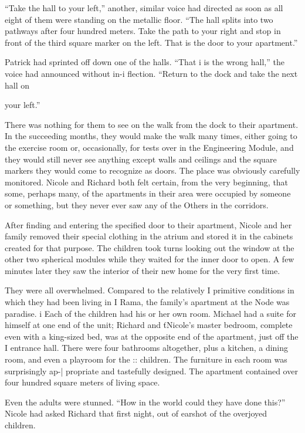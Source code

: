 \documentclass[]{article}
\begin{document}
{“Take the hall to your left,” another, similar voice had directed as soon as all eight of them were standing on the metallic floor. “The hall splits into two pathways after four hundred meters. Take the path to your right and stop in front of the third square marker on the left. That is the door to your apartment.”

Patrick had sprinted off down one of the halls. “That i is the wrong hall,” the voice had announced without in-i flection. “Return to the dock and take the next hall on

your left.”

There was nothing for them to see on the walk from the dock to their apartment. In the succeeding months, they would make the walk many times, either going to the exercise room or, occasionally, for tests over in the Engineering Module, and they would still never see anything except walls and ceilings and the square markers they would come to recognize as doors. The place was obviously carefully monitored. Nicole and Richard both felt certain, from the very beginning, that some, perhaps many, of the apartments in their area were occupied by someone or something, but they never ever saw any of the Others in the corridors.

After finding and entering the specified door to their apartment, Nicole and her family removed their special clothing in the atrium and stored it in the cabinets created for that purpose. The children took turns looking out the window at the other two spherical modules while they waited for the inner door to open. A few minutes later they saw the interior of their new home for the very first time.

They were all overwhelmed. Compared to the relatively I primitive conditions in which they had been living in I Rama, the family’s apartment at the Node was paradise. i Each of the children had his or her own room. Michael had a suite for himself at one end of the unit; Richard and ťNicole’s master bedroom, complete even with a king-sized bed, was at the opposite end of the apartment, just off the I entrance hall. There were four bathrooms altogether, plus a kitchen, a dining room, and even a playroom for the :: children. The furniture in each room was surprisingly ap-| propriate and tastefully designed. The apartment contained over four hundred square meters of living space.

Even the adults were stunned. “How in the world could they have done this?” Nicole had asked Richard that first night, out of earshot of the overjoyed children.

}
\end{document}
